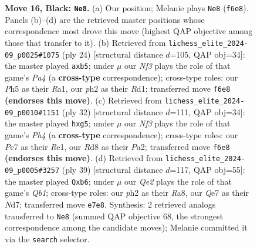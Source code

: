 \documentclass[11pt]{article}
\begin{document}
\begin{figure}[p]
\caption{\textbf{Move 16, Black: \texttt{Ne8}.} (a) Our position; Melanie plays \texttt{Ne8} (\texttt{f6e8}). Panels (b)--(d) are the retrieved master positions whose correspondence most drove this move (highest QAP objective among those that transfer to it). (b) Retrieved from \texttt{lichess\_elite\_2024-09\_p0025\#1075} (ply 24) [structural distance $d$=105, QAP obj=34]: the master played \texttt{axb5}; under $\mu$ our \emph{Nf3} plays the role of that game's \emph{Pa4} (a \textbf{cross-type} correspondence); cross-type roles: our \emph{P}h5 as their \emph{R}a1, our \emph{p}h2 as their \emph{R}d1; transferred move \texttt{f6e8} \textbf{(endorses this move)}. (c) Retrieved from \texttt{lichess\_elite\_2024-09\_p0010\#1151} (ply 32) [structural distance $d$=111, QAP obj=34]: the master played \texttt{hxg5}; under $\mu$ our \emph{Nf3} plays the role of that game's \emph{Ph4} (a \textbf{cross-type} correspondence); cross-type roles: our \emph{P}c7 as their \emph{R}e1, our \emph{R}d8 as their \emph{P}a2; transferred move \texttt{f6e8} \textbf{(endorses this move)}. (d) Retrieved from \texttt{lichess\_elite\_2024-09\_p0005\#3257} (ply 39) [structural distance $d$=117, QAP obj=55]: the master played \texttt{Qxb6}; under $\mu$ our \emph{Qe2} plays the role of that game's \emph{Qb1}; cross-type roles: our \emph{p}h2 as their \emph{R}a8, our \emph{Q}e7 as their \emph{N}d7; transferred move \texttt{e7e8}. Synthesis: 2 retrieved analogs transferred to \texttt{Ne8} (summed QAP objective 68, the strongest correspondence among the candidate moves); Melanie committed it via the \texttt{search} selector.}
\label{fig:thought-m31}
\end{figure}

\clearpage
\end{document}
